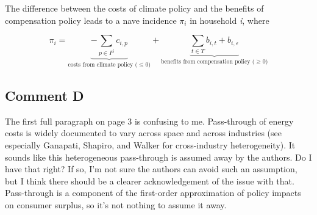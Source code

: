 \documentclass[11pt]{article}
\begin{document}
\begin{revisionbox}
The difference between the costs of climate policy and the benefits of compensation policy leads to a nave incidence $\pi_{i}$ in household \textit{i}, where

\begin{equation} \label{eq:pi}
    \pi_{i} = \underbrace{-\sum_{p\in P^{\prime}} c_{i,p}}_{\text{costs from climate policy ($\leq 0$)}} + \underbrace{\sum_{t\in T} b_{i,t} + b_{i,\varepsilon}}_{\text{benefits from compensation policy ($\geq 0$)}}
\end{equation}
\end{revisionbox}

\subsection*{Comment D}\label{comment_R1_D}

\begin{commentbox}
    The first full paragraph on page 3 is confusing to me. Pass-through of energy costs is widely documented to vary across space and across industries (see especially Ganapati, Shapiro, and Walker for cross-industry heterogeneity). It sounds like this heterogeneous pass-through is assumed away by the authors. Do I have that right? If so, I'm not sure the authors can avoid such an assumption, but I think there should be a clearer acknowledgement of the issue with that. Pass-through is a component of the first-order approximation of policy impacts on consumer surplus, so it's not nothing to assume it away.
\end{commentbox}
\end{document}
